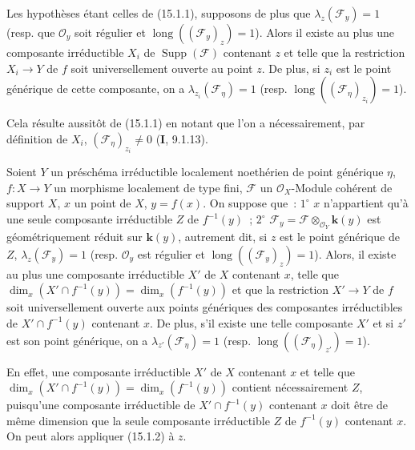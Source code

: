 \begin{corollary}[15.1.2]
\label{IV.15.1.2-fr}
Les hypothèses étant celles de \textup{(15.1.1)}, supposons de plus que
$\lambda_z(\mathcal F_y)=1$ \textup{(resp.} que $\mathcal O_y$ soit régulier et
$\operatorname{long}((\mathcal F_y)_z)=1$\textup{)}. Alors il existe au plus une composante
irréductible $X_i$ de $\operatorname{Supp}(\mathcal F)$ contenant $z$ et telle que
la restriction $X_i\to Y$ de $f$ soit universellement ouverte au point $z$. De
plus, si $z_i$ est le point générique de cette composante, on a
$\lambda_{z_i}(\mathcal F_\eta)=1$ \textup{(resp.
$\operatorname{long}((\mathcal F_\eta)_{z_i})=1$)}.
\end{corollary}

Cela résulte aussitôt de (15.1.1) en notant que l'on a nécessairement, par
définition de $X_i$, $(\mathcal F_\eta)_{z_i}\ne0$ (\textbf{I}, 9.1.13).

\begin{corollary}[15.1.3]
\label{IV.15.1.3-fr}
Soient $Y$ un préschéma irréductible localement noethérien de point générique
$\eta$, $f:X\to Y$ un morphisme localement de type fini, $\mathcal F$ un
$\mathcal O_X$-Module cohérent de support $X$, $x$ un point de $X$, $y=f(x)$. On
suppose que~: $1^\circ$ $x$ n'appartient qu'à une seule composante irréductible
$Z$ de $f^{-1}(y)$~; $2^\circ$
$\mathcal F_y=\mathcal F\otimes_{\mathcal O_Y}\boldsymbol{k}(y)$ est géométriquement
réduit sur $\boldsymbol{k}(y)$, autrement dit, si $z$ est le point générique de $Z$,
$\lambda_z(\mathcal F_y)=1$ \textup{(resp.} $\mathcal O_y$ est régulier et
$\operatorname{long}((\mathcal F_y)_z)=1$\textup{)}. Alors, il existe au plus une
composante irréductible $X'$ de $X$ contenant $x$, telle que
$\dim_x(X'\cap f^{-1}(y))=\dim_x(f^{-1}(y))$ et que la restriction $X'\to Y$ de
$f$ soit universellement ouverte aux points génériques des composantes
irréductibles de $X'\cap f^{-1}(y)$ contenant $x$. De plus, s'il existe une telle
composante $X'$ et si $z'$ est son point générique, on a
$\lambda_{z'}(\mathcal F_\eta)=1$ \textup{(resp.
$\operatorname{long}((\mathcal F_\eta)_{z'})=1$)}.
\end{corollary}

En effet, une composante irréductible $X'$ de $X$ contenant $x$ et telle que
$\dim_x(X'\cap f^{-1}(y))=\dim_x(f^{-1}(y))$ contient nécessairement $Z$,
puisqu'une composante irréductible de $X'\cap f^{-1}(y)$ contenant $x$ doit être
de même dimension que la seule composante irréductible $Z$ de $f^{-1}(y)$
contenant $x$. On peut alors appliquer (15.1.2) à $z$.

